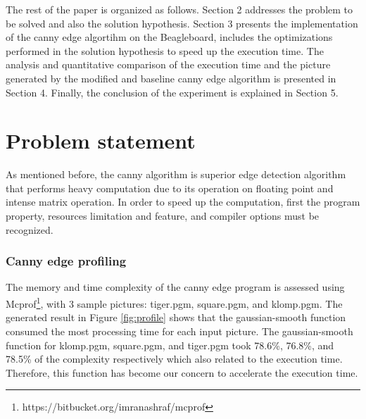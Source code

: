 \documentclass[conference]{IEEEtran}
\begin{document}
The rest of the paper is organized as follows. Section 2 addresses the problem to be solved and also the solution hypothesis. Section 3 presents the implementation of the canny edge algortihm on the Beagleboard, includes the optimizations performed in the solution hypothesis to speed up the execution time. The analysis and quantitative comparison of the execution time and the picture generated by the modified and baseline canny edge algorithm is presented in Section 4. Finally, the conclusion of the experiment is explained in Section 5.

\section{Problem statement}

As mentioned before, the canny algorithm is superior edge detection algorithm that performs heavy computation due to its operation on floating point and intense matrix operation. In order to speed up the computation, first the program property, resources limitation and feature, and compiler options must be recognized.

\subsubsection{Canny edge profiling}
The memory and time complexity of the canny edge program is assessed using Mcprof\footnote{https://bitbucket.org/imranashraf/mcprof}, with 3 sample pictures: tiger.pgm, square.pgm, and klomp.pgm. The generated result in Figure \ref{fig:profile} shows that the gaussian-smooth function consumed the most processing time for each input picture. The gaussian-smooth function for klomp.pgm, square.pgm, and tiger.pgm took 78.6\%, 76.8\%, and 78.5\% of the complexity respectively which also related to the execution time. Therefore, this function has become our concern to accelerate the execution time.
\end{document}
